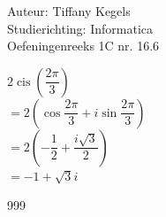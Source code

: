 \documentclass[a4paper]{article}
\begin{document}
  
\noindent \large Auteur: Tiffany Kegels \\
\noindent \large Studierichting: Informatica\\
\noindent \large Oefeningenreeks 1C nr. 16.6\\

\medskip

\normalsize

$2 \operatorname{cis} \left( \dfrac{2\pi}{3} \right)$\\

$=2 \left( \cos \dfrac{2\pi}{3} + i \sin \dfrac{2\pi}{3}\right)$\\

$=2 \left( -\dfrac{1}{2} + \dfrac{i\sqrt{3}}{2}\right)$\\

$= -1 + \sqrt{3}i$\\


\begin{thebibliography}{999}

\end{thebibliography}
\end{document}
